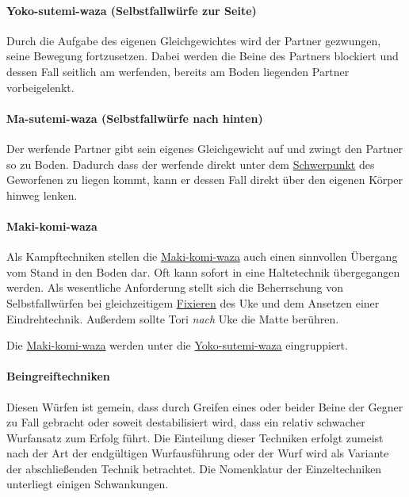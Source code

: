 \documentclass[justified, a4paper, notitlepage, captions=tableheading, nobib]{tufte-handout}
\begin{document}
\paragraph{\label{org3630628}Yoko-sutemi-waza (Selbstfallwürfe zur Seite) }
\label{sec:org3fc0580}
Durch die Aufgabe des eigenen Gleichgewichtes wird der Partner gezwungen, seine Bewegung fortzusetzen. Dabei werden die Beine des Partners blockiert und dessen Fall seitlich am werfenden, bereits am Boden liegenden Partner vorbeigelenkt. 

\paragraph{\label{org137e7ce}Ma-sutemi-waza (Selbstfallwürfe nach hinten) }
\label{sec:org72def49}
Der werfende Partner gibt sein eigenes Gleichgewicht auf und zwingt den Partner so zu Boden. Dadurch dass der werfende direkt unter dem \hyperref[org8fdad0e]{Schwerpunkt} des Geworfenen zu liegen kommt, kann er dessen Fall direkt über den eigenen Körper hinweg lenken.

\paragraph{\label{org737839a}Maki-komi-waza }
\label{sec:orgdd2a744}
Als Kampftechniken stellen die \hyperref[org737839a]{Maki-komi-waza} auch einen sinnvollen Übergang vom Stand in den Boden dar. Oft kann sofort in eine Haltetechnik übergegangen werden. Als wesentliche Anforderung stellt sich die Beherrschung von Selbstfallwürfen bei gleichzeitigem \hyperref[org62822f6]{Fixieren} des Uke und dem Ansetzen einer Eindrehtechnik. Außerdem sollte Tori \emph{nach} Uke die Matte berühren.

Die \hyperref[org737839a]{Maki-komi-waza} werden unter die \hyperref[org3630628]{Yoko-sutemi-waza} eingruppiert. 

\paragraph{\label{org8c59ee1}Beingreiftechniken }
\label{sec:org7006ff9}
Diesen Würfen ist gemein, dass durch Greifen eines oder beider Beine der Gegner zu Fall gebracht oder soweit destabilisiert wird, dass ein relativ schwacher Wurfansatz zum Erfolg führt. Die Einteilung dieser Techniken erfolgt zumeist nach der Art der endgültigen Wurfausführung oder der Wurf wird als Variante der abschließenden Technik betrachtet. Die Nomenklatur der Einzeltechniken unterliegt einigen Schwankungen.
\end{document}
